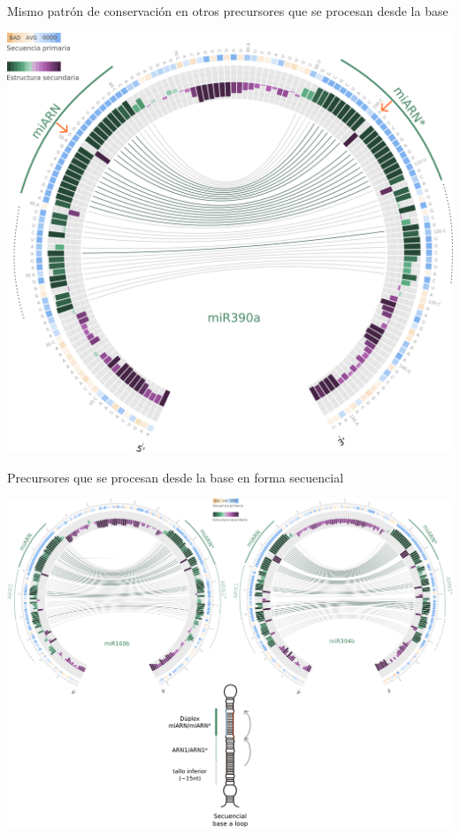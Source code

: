 \documentclass{beamer}
\begin{document}
\begin{frame}{Mismo patrón de conservación en otros precursores que se procesan desde la base}
	\begin{center}
		\includegraphics[width=.7\textwidth]{img/miR390a_circos.png}
	\end{center}
\end{frame}

\begin{frame}{Precursores que se procesan desde la base en forma secuencial}
	\begin{center}
		\includegraphics[width=1\textwidth]{img/seqBTL_circos.png}
	\end{center}
\end{frame}
\end{document}
